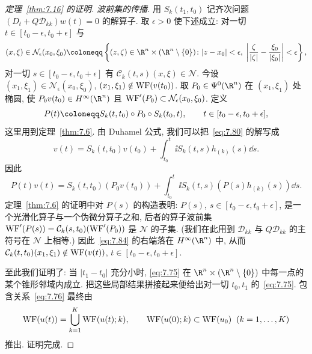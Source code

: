 \begin{proof}[定理~\ref{thm:7.16} 的证明]
\emph{波前集的传播.} 用 $S_k(t_1, t_0)$ 记齐次问题 $(D_t + Q\mathcal{D}_{kk})w(t) = 0$ 的解算子. 取 $\epsilon > 0$ 使下述成立: 对一切 $t \in [t_0 - \epsilon, t_0 + \epsilon]$ 与
\begin{equation}\label{eq:7.81}
    (x, \xi) \in \mathcal{N}_\epsilon(x_0, \xi_0) \defeq \left\{ (z, \zeta) \in \R^n \times (\R^n \setminus \{0\}) \colon | z - x_0 | < \epsilon, \; \left| \frac{\zeta}{|\zeta|} - \frac{\xi_0}{|\xi_0|} \right| < \epsilon \right\},
\end{equation}
对一切 $s \in [t_0 - \epsilon, t_0 + \epsilon]$ 有 $\mathcal{C}_k(t, s)(x, \xi) \in \mathcal{N}$. 今设 $(x_1, \xi_1) \in \mathcal{N}_\epsilon(x_0, \xi_0)$, $(x_1, \xi_1) \notin \operatorname{WF}(v(t_0))$. 取 $P_0 \in \Psi^0(\R^n)$ 在 $(x_1, \xi_1)$ 处椭圆, 使 $P_0 v(t_0) \in H^\infty(\R^n)$ 且 $\operatorname{WF}'(P_0) \subset \mathcal{N}_\epsilon(x_0, \xi_0)$. 定义
\begin{equation}\label{eq:7.82}
    P(t) \defeq S_k(t, t_0) \circ P_0 \circ S_k(t_0, t), \qquad t \in [t_0 - \epsilon, t_0 + \epsilon],
\end{equation}
这里用到定理~\ref{thm:7.6}. 由 Duhamel 公式, 我们可以把~\eqref{eq:7.80} 的解写成
\begin{equation}\label{eq:7.83}
    v(t) = S_k(t, t_0)v(t_0) + \int_{t_0}^t \ii S_k(t, s)h_{(k)}(s) \dd s.
\end{equation}
因此
\begin{equation}\label{eq:7.84}
    P(t)v(t) = S_k(t, t_0)\left( P_0 v(t_0) \right) + \int_{t_0}^t \ii S_k(t, s)\left( P(s)h_{(k)}(s) \right) \dd s.
\end{equation}
定理~\ref{thm:7.6} 的证明中对 $P(s)$ 的构造表明: $P(s)$, $s \in [t_0 - \epsilon, t_0 + \epsilon]$, 是一个光滑化算子与一个伪微分算子之和, 后者的算子波前集 $\operatorname{WF}'(P(s)) = \mathcal{C}_k(s, t_0)(\operatorname{WF}'(P_0))$ 是 $\mathcal{N}$ 的子集. (我们在此用到 $\mathcal{D}_{kk}$ 与 $Q\mathcal{D}_{kk}$ 的主符号在 $\mathcal{N}$ 上相等.) 因此~\eqref{eq:7.84} 的右端落在 $H^\infty(\R^n)$ 中, 从而 $\mathcal{C}_k(t, t_0)(x_1, \xi_1) \notin \operatorname{WF}(v(t))$, $t \in [t_0 - \epsilon, t_0 + \epsilon]$.

至此我们证明了: 当 $| t_1 - t_0 |$ 充分小时, \eqref{eq:7.75} 在 $\R^n \times (\R^n \setminus \{0\})$ 中每一点的某个锥形邻域内成立. 把这些局部结果拼接起来便给出对一切 $t_0, t_1$ 的~\eqref{eq:7.75}. 包含关系~\eqref{eq:7.76} 最终由
\begin{equation}\label{eq:7.85}
    \operatorname{WF}(u(t)) = \bigcup_{k=1}^K \operatorname{WF}(u(t); k), \qquad \operatorname{WF}(u(0); k) \subset \operatorname{WF}(u_0) \;\; (k = 1, \ldots, K)
\end{equation}
推出. 证明完成.
\end{proof}

